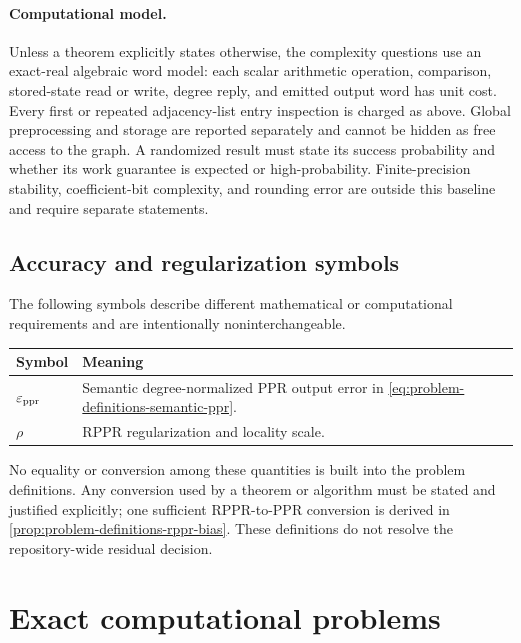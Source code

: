 \documentclass[11pt]{article}
\begin{document}
\paragraph{Computational model.}
Unless a theorem explicitly states otherwise, the complexity questions use an
exact-real algebraic word model: each scalar arithmetic operation, comparison,
stored-state read or write, degree reply, and emitted output word has unit
cost.  Every first or repeated adjacency-list entry inspection is charged as
above.  Global preprocessing and storage are reported separately and cannot
be hidden as free access to the graph.  A randomized result must state its
success probability and whether its work guarantee is expected or
high-probability.  Finite-precision stability, coefficient-bit complexity,
and rounding error are outside this baseline and require separate statements.

\subsection{Accuracy and regularization symbols}
\label{subsec:problem-definitions-accuracy-symbols}

The following symbols describe different mathematical or computational
requirements and are intentionally noninterchangeable.

\begin{center}
\begin{tabularx}{0.97\textwidth}{@{}
    >{\raggedright\arraybackslash}p{}
    >{\raggedright\arraybackslash}X@{}}
\toprule
Symbol & Meaning \\
\midrule
$\varepsilon_{\mathrm{ppr}}$ & Semantic degree-normalized PPR output error in
\cref{eq:problem-definitions-semantic-ppr}. \\
$\rho$ & RPPR regularization and locality scale. \\
\bottomrule
\end{tabularx}
\end{center}

No equality or conversion among these quantities is built into the problem
definitions.  Any conversion used by a theorem or algorithm must be stated
and justified explicitly; one sufficient RPPR-to-PPR conversion is derived in
\cref{prop:problem-definitions-rppr-bias}.  These definitions do not resolve
the repository-wide residual decision.


\section{Exact computational problems}
\label{sec:problem-definitions-problems}
\end{document}
